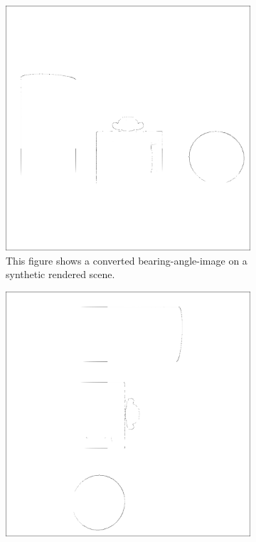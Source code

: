 \begin{figure}[H]
    \begin{subfigure}[t]{0.32\textwidth}
        \includegraphics[width=\linewidth]{chapter04/img/flexion-0001.png}
        \caption{This figure shows a converted \gls{bearing-angle-image} on a synthetic rendered scene.}
    \end{subfigure}
    \begin{subfigure}[t]{0.32\textwidth}
        \includegraphics[width=\linewidth]{chapter04/img/flexion-0030.png}

\end{subfigure}
\end{figure}
